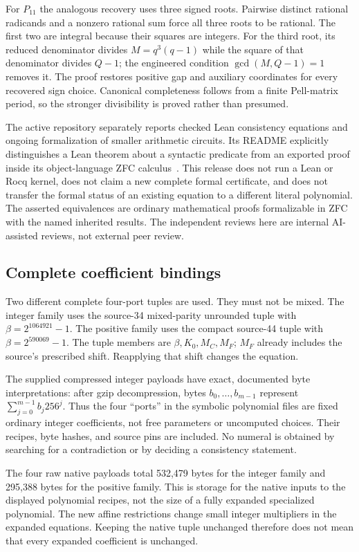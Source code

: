 \documentclass[11pt,letterpaper]{article}
\theoremstyle{remark}
\begin{document}
For $P_{11}$ the analogous recovery uses three signed roots.  Pairwise
distinct rational radicands and a nonzero rational sum force all three
roots to be rational.  The first two are integral because their squares
are integers.  For the third root, its reduced denominator divides
$M=q^3(q-1)$ while the square of that denominator divides $Q-1$; the
engineered condition $\gcd(M,Q-1)=1$ removes it.  The proof restores
positive gap and auxiliary coordinates for every recovered sign choice.
Canonical completeness follows from a finite Pell-matrix period, so the
stronger divisibility is proved rather than presumed.

The active repository separately reports checked Lean consistency
equations and ongoing formalization of smaller arithmetic circuits.
Its README explicitly distinguishes a Lean theorem about a syntactic
predicate from an exported proof inside its object-language ZFC
calculus~\cite{active}.  This release does not run a Lean or Rocq kernel,
does not claim a new complete formal certificate, and does not transfer
the formal status of an existing equation to a different literal
polynomial.  The asserted equivalences are ordinary mathematical
proofs formalizable in ZFC with the named inherited results.  The
independent reviews here are internal AI-assisted reviews, not external
peer review.

\subsection{Complete coefficient bindings}

Two different complete four-port tuples are used.  They must not be
mixed.  The integer family uses the source-34 mixed-parity unrounded
tuple with $\beta=2^{1064921}-1$.  The positive family uses the compact
source-44 tuple with $\beta=2^{590069}-1$.  The tuple members are
$\beta,K_0,M_C,M_F$; $M_F$ already includes the source's prescribed
shift.  Reapplying that shift changes the equation.

The supplied compressed integer payloads have exact, documented byte
interpretations: after gzip decompression, bytes $b_0,\ldots,b_{m-1}$
represent $\sum_{j=0}^{m-1}b_j256^j$.  Thus the four ``ports'' in the
symbolic polynomial files are fixed ordinary integer coefficients,
not free parameters or uncomputed choices.  Their recipes, byte hashes,
and source pins are included.  No numeral is obtained by searching for
a contradiction or by deciding a consistency statement.

The four raw native payloads total 532,479 bytes for the integer family
and 295,388 bytes for the positive family.  This is storage for the
native inputs to the displayed polynomial recipes, not the size of a
fully expanded specialized polynomial.  The new affine restrictions
change small integer multipliers in the expanded equations.  Keeping
the native tuple unchanged therefore does not mean that every expanded
coefficient is unchanged.
\end{document}

